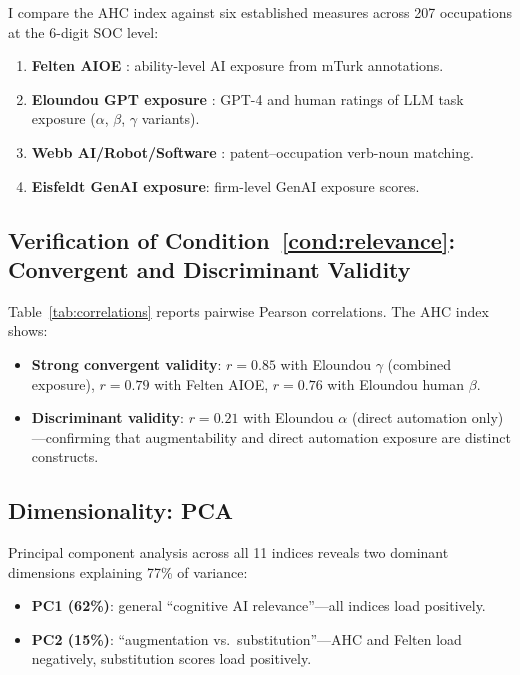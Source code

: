 \documentclass[11pt,a4paper]{article}
\theoremstyle{definition}
\begin{document}
I compare the AHC index against six established measures across 207 occupations at the 6-digit SOC level:

\begin{enumerate}[leftmargin=*]
\item \textbf{Felten AIOE} \citep{felten2021occupational}: ability-level AI exposure from mTurk annotations.
\item \textbf{Eloundou GPT exposure} \citep{eloundou2024gpts}: GPT-4 and human ratings of LLM task exposure ($\alpha$, $\beta$, $\gamma$ variants).
\item \textbf{Webb AI/Robot/Software} \citep{webb2020impact}: patent--occupation verb-noun matching.
\item \textbf{Eisfeldt GenAI exposure}: firm-level GenAI exposure scores.
\end{enumerate}

\subsection{Verification of Condition~\ref{cond:relevance}: Convergent and Discriminant Validity}

Table~\ref{tab:correlations} reports pairwise Pearson correlations. The AHC index shows:

\begin{itemize}[leftmargin=*]
\item \textbf{Strong convergent validity}: $r = 0.85$ with Eloundou $\gamma$ (combined exposure), $r = 0.79$ with Felten AIOE, $r = 0.76$ with Eloundou human $\beta$.
\item \textbf{Discriminant validity}: $r = 0.21$ with Eloundou $\alpha$ (direct automation only)---confirming that augmentability and direct automation exposure are distinct constructs.
\end{itemize}

\subsection{Dimensionality: PCA}

Principal component analysis across all 11 indices reveals two dominant dimensions explaining 77\% of variance:
\begin{itemize}[leftmargin=*]
\item \textbf{PC1 (62\%)}: general ``cognitive AI relevance''---all indices load positively.
\item \textbf{PC2 (15\%)}: ``augmentation vs.\ substitution''---AHC and Felten load negatively, substitution scores load positively.
\end{itemize}
\end{document}

